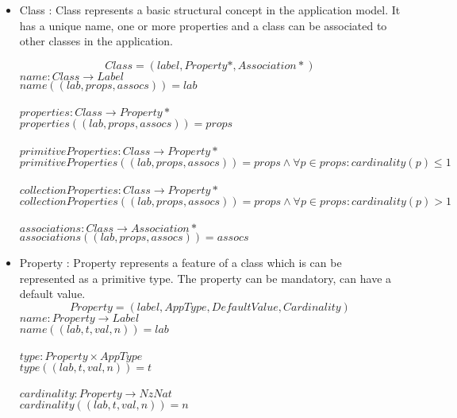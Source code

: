 \documentclass[11pt]{article}
\begin{document}
\begin{itemize}
	\item Class : Class represents a basic structural concept in the application model. It has a unique name, one or more properties and a class can be associated to other classes in the application. 
	 
$$Class = (label, Property*, Association*)$$
$name : Class \rightarrow Label$ \\
$name((lab, props, assocs)) = lab$ \\ \\
$properties : Class \rightarrow Property*$ \\
$properties((lab, props, assocs)) = props $\\ \\
$primitiveProperties : Class \rightarrow Property*$ \\
$primitiveProperties((lab, props, assocs)) = props \wedge \forall p \in props : cardinality(p) \leq 1 $\\ \\
$collectionProperties : Class \rightarrow Property*$ \\
$collectionProperties((lab, props, assocs)) = props \wedge \forall p \in props : cardinality(p) > 1 $\\ \\
$associations : Class \rightarrow Association*$ \\
$associations((lab, props, assocs)) = assocs $


	\item Property : Property represents a feature of  a class which is can be represented as a primitive type. The property can be mandatory, can have a default value.
$$
Property = (label, AppType, DefaultValue, Cardinality)
$$
$name : Property \rightarrow Label$ \\
$name((lab, t, val, n)) = lab$ \\ \\
$type : Property \times AppType$ \\
$type((lab, t, val, n)) = t$ \\ \\
$cardinality : Property \rightarrow NzNat$ \\
$cardinality((lab, t, val, n)) = n$ 





\end{itemize}
\end{document}
